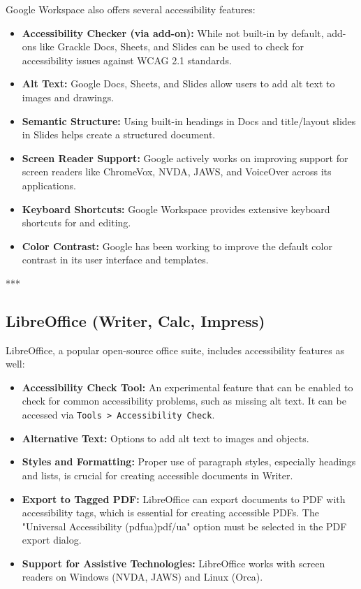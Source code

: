 Google Workspace also offers several accessibility features\supercite{GoogleAccessibility}:
\begin{itemize}
	\item \textbf{Accessibility Checker (via add-on):} While not built-in by default, add-ons like Grackle Docs, Sheets, and Slides can be used to check for accessibility issues against WCAG 2.1 standards.
	\item \textbf{Alt Text:} Google Docs, Sheets, and Slides allow users to add alt text to images and drawings.
	\item \textbf{Semantic Structure:} Using built-in headings in Docs and title/layout slides in Slides helps create a structured document.
	\item \textbf{Screen Reader Support:} Google actively works on improving support for screen readers like ChromeVox, NVDA, JAWS, and VoiceOver across its applications.
	\item \textbf{Keyboard Shortcuts:} Google Workspace provides extensive keyboard shortcuts for  and editing.
	\item \textbf{Color Contrast:} Google has been working to improve the default color contrast in its user interface and templates.
\end{itemize}

***

\subsection{LibreOffice (Writer, Calc, Impress)}
\label{sub:libreoffice-writer-calc-impress}

LibreOffice, a popular open-source office suite, includes accessibility features as well\supercite{LibreOfficeAccessibility}:
\begin{itemize}
	\item \textbf{Accessibility Check Tool:} An experimental feature that can be enabled to check for common accessibility problems, such as missing alt text. It can be accessed via \texttt{Tools > Accessibility Check}.
	\item \textbf{Alternative Text:} Options to add alt text to images and objects.
	\item \textbf{Styles and Formatting:} Proper use of paragraph styles, especially headings and lists, is crucial for creating accessible documents in Writer.
	\item \textbf{Export to Tagged PDF:} LibreOffice can export documents to PDF with accessibility tags, which is essential for creating accessible PDFs. The "Universal Accessibility (\gls{pdfua})\gls{pdf/ua}" option must be selected in the PDF export dialog.
	\item \textbf{Support for Assistive Technologies:} LibreOffice works with screen readers on Windows (NVDA, JAWS) and Linux (Orca).
\end{itemize}

